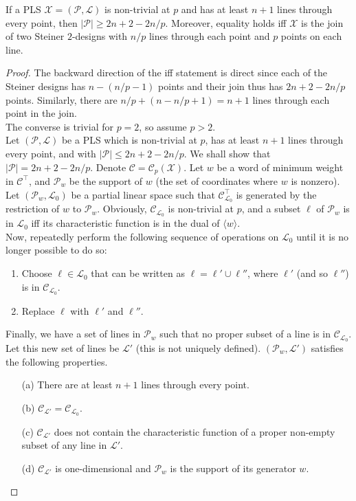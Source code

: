 	\begin{ftheo}
		If a PLS $\mathcal{X} = (\mathcal{P},\mathcal{L})$ is non-trivial at $p$ and has at least $n+1$ lines through every point, then $|\mathcal{P}| \ge 2n+2-2n/p$. Moreover, equality holds iff $\mathcal{X}$ is the join of two Steiner $2$-designs with $n/p$ lines through each point and $p$ points on each line.
	\end{ftheo}
	\begin{proof}
		The backward direction of the iff statement is direct since each of the Steiner designs has $n - (n/p - 1)$ points and their join thus has $2n+2-2n/p$ points. Similarly, there are $n/p + (n - n/p + 1) = n+1$ lines through each point in the join.\\
		
		The converse is trivial for $p = 2$, so assume $p > 2$. \\
		Let $(\mathcal{P},\mathcal{L})$ be a PLS which is non-trivial at $p$, has at least $n+1$ lines through every point, and with $|\mathcal{P}| \le 2n+2-2n/p$. We shall show that $|\mathcal{P}| = 2n+2-2n/p$. Denote $\mathcal{C} = \mathcal{C}_p(\mathcal{X})$. Let $w$ be a word of minimum weight in $\mathcal{C}^\top$, and $\mathcal{P}_w$ be the support of $w$ (the set of coordinates where $w$ is nonzero). Let $(\mathcal{P}_w,\mathcal{L}_0)$ be a partial linear space such that $\mathcal{C}_{\mathcal{L}_0}^\top$ is generated by the restriction of $w$ to $\mathcal{P}_w$. Obviously, $\mathcal{C}_{\mathcal{L}_0}$ is non-trivial at $p$, and a subset $\ell$ of $\mathcal{P}_w$ is in $\mathcal{L}_0$ iff its characteristic function is in the dual of $\langle w \rangle$.\\
		Now, repeatedly perform the following sequence of operations on $\mathcal{L}_0$ until it is no longer possible to do so:
		\begin{enumerate}
			\item Choose $\ell \in \mathcal{L}_0$ that can be written as $\ell = \ell' \cup \ell''$, where $\ell'$ (and so $\ell''$) is in $\mathcal{C}_{\mathcal{L}_0}$.
			\item Replace $\ell$ with $\ell'$ and $\ell''$.
		\end{enumerate}
		Finally, we have a set of lines in $\mathcal{P}_w$ such that no proper subset of a line is in $\mathcal{C}_{\mathcal{L}_0}$. Let this new set of lines be $\mathcal{L}'$ (this is not uniquely defined). $(\mathcal{P}_w,\mathcal{L}')$ satisfies the following properties.
		\begin{itemize}
			\item[(a)] There are at least $n+1$ lines through every point.
			\item[(b)] $\mathcal{C}_{\mathcal{L}'} = \mathcal{C}_{\mathcal{L}_0}$.
			\item[(c)] $\mathcal{C}_{\mathcal{L}'}$ does not contain the characteristic function of a proper non-empty subset of any line in $\mathcal{L}'$.
			\item[(d)] $\mathcal{C}_{\mathcal{L}'}$ is one-dimensional and $\mathcal{P}_w$ is the support of its generator $w$.
		\end{itemize}


\end{proof}
